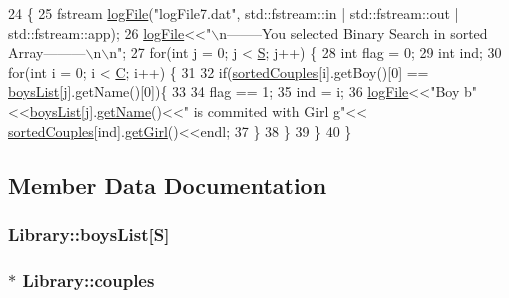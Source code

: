 \begin{DoxyCode}
24 \{
25     fstream \hyperlink{classLibrary_ad8fbb4e17a98e57b3cffe8257710045d}{logFile}(\textcolor{stringliteral}{"logFile7.dat"}, std::fstream::in | std::fstream::out | std::fstream::app);
26     \hyperlink{classLibrary_ad8fbb4e17a98e57b3cffe8257710045d}{logFile}<<\textcolor{stringliteral}{"\(\backslash\)n--------You selected Binary Search in sorted Array---------\(\backslash\)n\(\backslash\)n"};
27     \textcolor{keywordflow}{for}(\textcolor{keywordtype}{int} j = 0; j < \hyperlink{lib7_8h_af933676109efed7ab34cea71d748a517}{S}; j++) \{
28         \textcolor{keywordtype}{int} flag = 0;
29         \textcolor{keywordtype}{int} ind;
30         \textcolor{keywordflow}{for}(\textcolor{keywordtype}{int} i = 0; i < \hyperlink{dst9_8h_ac4cf4b2ab929bd23951a8676eeac086b}{C}; i++) \{
31 
32             \textcolor{keywordflow}{if}(\hyperlink{classLibrary_ac22a9d065ab96fcb3d44e203725e6de6}{sortedCouples}[i].getBoy()[0] == \hyperlink{classLibrary_a28fd1fddb9c961b2cfbb4a054f1ab258}{boysList}[j].getName()[0])\{
33 
34                 flag == 1;
35                 ind = i;        
36                 \hyperlink{classLibrary_ad8fbb4e17a98e57b3cffe8257710045d}{logFile}<<\textcolor{stringliteral}{"Boy b"}<<\hyperlink{classLibrary_a28fd1fddb9c961b2cfbb4a054f1ab258}{boysList}[j].\hyperlink{classBoy_a53e90a641c928c0849e33eca847e902d}{getName}()<<\textcolor{stringliteral}{" is commited with Girl g"}<<
      \hyperlink{classLibrary_ac22a9d065ab96fcb3d44e203725e6de6}{sortedCouples}[ind].\hyperlink{classCouple_a653983df7e331c0534ae2ce42e9856c5}{getGirl}()<<endl; 
37             \} 
38         \}
39     \}
40 \}
\end{DoxyCode}


\subsection{Member Data Documentation}
\subsubsection[{\texorpdfstring{boys\+List}{boysList}}]{ Library\+::boys\+List\mbox{[}{\bf S}\mbox{]}}\hypertarget{classLibrary_a28fd1fddb9c961b2cfbb4a054f1ab258}{}\label{classLibrary_a28fd1fddb9c961b2cfbb4a054f1ab258}
\subsubsection[{\texorpdfstring{couples}{couples}}]{$\ast$ Library\+::couples}\hypertarget{classLibrary_a37cc785266d6a6aeb820499ba875cef1}{}\label{classLibrary_a37cc785266d6a6aeb820499ba875cef1}
